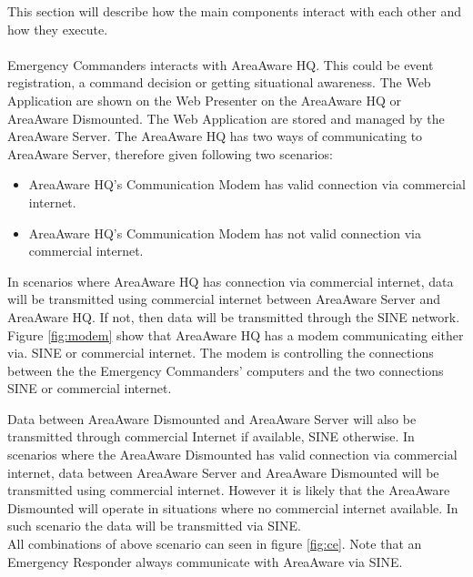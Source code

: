 This section will describe how the main components interact with each other and how they execute.\\\\
\noindent Emergency Commanders interacts with AreaAware HQ.
This could be event registration, a command decision or getting situational awareness.
The Web Application are shown on the Web Presenter on the AreaAware HQ or AreaAware Dismounted.
The Web Application are stored and managed by the AreaAware Server.
The AreaAware HQ has two ways of communicating to AreaAware Server, therefore given following two scenarios:
\begin{itemize}
\item AreaAware HQ's Communication Modem has valid connection via commercial internet.
\item AreaAware HQ's Communication Modem has not valid connection via commercial internet.
\end{itemize}
In scenarios where AreaAware HQ has connection via commercial internet, data will be transmitted using commercial internet between AreaAware Server and AreaAware HQ.
If not, then data will be transmitted through the SINE network.
Figure \ref{fig:modem} show that AreaAware HQ has a modem communicating either via. SINE or commercial internet. The modem is controlling the connections between the the Emergency  Commanders' computers and the  two connections SINE or commercial internet.


\noindent Data between AreaAware Dismounted and AreaAware Server will also be transmitted through commercial Internet if available, SINE otherwise.
In scenarios where the AreaAware Dismounted has valid connection via commercial internet, data between AreaAware Server and AreaAware Dismounted will be transmitted using commercial internet.
However it is likely that the AreaAware Dismounted will operate in situations where no commercial internet available.
In such scenario the data will be transmitted via SINE.\\

\noindent All combinations of above scenario can seen in figure \ref{fig:ce}.
Note that an Emergency Responder always communicate with AreaAware via SINE.

